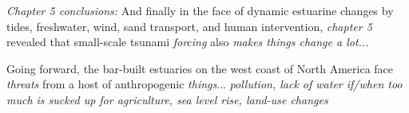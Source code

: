\emph{Chapter 5 conclusions:}
And finally in the face of dynamic estuarine changes by tides, freshwater, wind, sand transport, and human intervention, \emph{chapter 5} revealed that small-scale tsunami \emph{forcing} also \emph{makes things change a lot...}

Going forward, the bar-built estuaries on the west coast of North America face \emph{threats} from a host of anthropogenic \emph{things}... \emph{pollution, lack of water if/when too much is sucked up for agriculture, sea level rise, land-use changes}
